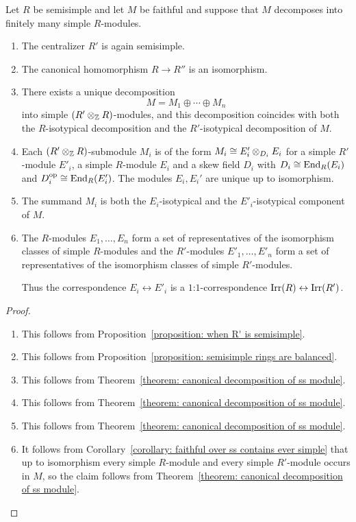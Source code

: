 \begin{theorem}
  \label{theorem: general double centralizer theorem}
  Let $R$ be semisimple and let $M$ be faithful and suppose that $M$ decomposes into finitely many simple $R$-modules.
  \begin{enumerate}
    \item
      The centralizer $R'$ is again semisimple.
    \item
      The canonical homomorphism $R \to R''$ is an isomorphism.
    \item
      There exists a unique decomposition
      \[
          M
        = M_1 \oplus \dotsb \oplus M_n
      \]
      into simple $(R' \mathbin{\otimes}_{\mathbb{Z}} R)$-modules, and this decomposition coincides with both the $R$-isotypical decomposition and the $R'$-isotypical decomposition of $M$.
    \item
      Each $(R' \mathbin{\otimes}_{\mathbb{Z}} R)$-submodule $M_i$ is of the form $M_i \cong E'_i \mathbin{\otimes}_{D_i} E_i$ for a simple $R'$-module $E'_i$, a simple $R$-module $E_i$ and a skew field $D_i$ with $D_i \cong \operatorname{End}_R(E_i)$ and $D_i^{\operatorname{op}} \cong \operatorname{End}_R(E'_i)$.
      The modules $E_i, E_i'$ are unique up to isomorphism.
    \item
      The summand $M_i$ is both the $E_i$-isotypical and the $E'_i$-isotypical component of $M$.
    \item
      The $R$-modules $E_1, \dotsc, E_n$ form a set of representatives of the isomorphism classes of simple $R$-modules and the $R'$-modules $E'_1, \dotsc, E'_n$ form a set of representatives of the isomorphism classes of simple $R'$-modules.
      
      Thus the correspondence $E_i \leftrightarrow E'_i$ is a $1$:$1$-correspondence $\operatorname{Irr}(R) \leftrightarrow \operatorname{Irr}(R')$.
  \end{enumerate}
\end{theorem}


\begin{proof}
  \leavevmode
  \begin{enumerate}
    \item
      This follows from Proposition~\ref{proposition: when R' is semisimple}.
    \item
      This follows from Proposition~\ref{proposition: semisimple rings are balanced}.
    \item
      This follows from Theorem~\ref{theorem: canonical decomposition of ss module}.
    \item
      This follows from Theorem~\ref{theorem: canonical decomposition of ss module}.
    \item
      This follows from Theorem~\ref{theorem: canonical decomposition of ss module}.
    \item
      It follows from Corollary~\ref{corollary: faithful over ss contains ever simple} that up to isomorphism every simple $R$-module and every simple $R'$-module occurs in $M$, so the claim follows from Theorem~\ref{theorem: canonical decomposition of ss module}.
    \qedhere
  \end{enumerate}
\end{proof}


